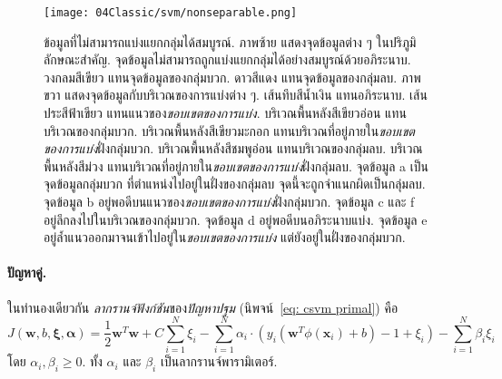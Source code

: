 \begin{figure}
	\begin{center}
	\texttt{[image: 04Classic/svm/nonseparable.png]}
	\end{center}
	\caption[ข้อมูลที่ไม่สามารถแบ่งแยกกลุ่มได้สมบูรณ์]{ข้อมูลที่ไม่สามารถแบ่งแยกกลุ่มได้สมบูรณ์.
	ภาพซ้าย แสดงจุดข้อมูลต่าง ๆ ในปริภูมิลักษณะสำคัญ.
	จุดข้อมูลไม่สามารถถูกแบ่งแยกกลุ่มได้อย่างสมบูรณ์ด้วยอภิระนาบ.
	วงกลมสีเขียว แทนจุดข้อมูลของกลุ่มบวก.
	ดาวสีแดง แทนจุดข้อมูลของกลุ่มลบ.
	ภาพขวา แสดงจุดข้อมูลกับบริเวณของการแบ่งต่าง ๆ.
	เส้นทึบสีน้ำเงิน แทนอภิระนาบ.
	เส้นประสีฟ้าเขียว แทนแนวของ\textit{ขอบเขตของการแบ่ง}.
	บริเวณพื้นหลังสีเขียวอ่อน แทนบริเวณของกลุ่มบวก.
	บริเวณพื้นหลังสีเขียวมะกอก แทนบริเวณที่อยู่ภายใน\textit{ขอบเขตของการแบ่ง}ฝั่งกลุ่มบวก.
	บริเวณพื้นหลังสีชมพูอ่อน แทนบริเวณของกลุ่มลบ.
	บริเวณพื้นหลังสีม่วง แทนบริเวณที่อยู่ภายใน\textit{ขอบเขตของการแบ่ง}ฝั่งกลุ่มลบ.
	จุดข้อมูล a เป็นจุดข้อมูลกลุ่มบวก ที่ตำแหน่งไปอยู่ในฝั่งของกลุ่มลบ จุดนี้จะถูกจำแนกผิดเป็นกลุ่มลบ.
	จุดข้อมูล b อยู่พอดีบนแนวของ\textit{ขอบเขตของการแบ่ง}ฝั่งกลุ่มบวก.
	จุดข้อมูล c และ f อยู่ลึกลงไปในบริเวณของกลุ่มบวก.
	จุดข้อมูล d อยู่พอดีบนอภิระนาบแบ่ง.
	จุดข้อมูล e อยู่ล้ำแนวออกมาจนเข้าไปอยู่ใน\textit{ขอบเขตของการแบ่ง} แต่ยังอยู่ในฝั่งของกลุ่มบวก.
	}
	\label{fig: non-linearly-separable data}
\end{figure}

\paragraph{ปัญหาคู่.}
ในทำนองเดียวกัน
\textit{ลากรานจ์ฟังก์ชัน}ของ\textit{ปัญหาปฐม} (นิพจน์~\ref{eq: csvm primal})
คือ
\[
J(\bm{w}, b, \bm{\xi}, \bm{\alpha})
= \frac{1}{2} \bm{w}^T \bm{w} + C \sum_{i=1}^N \xi_i
- \sum_{i=1}^N \alpha_i \cdot \left(y_i \left( \bm{w}^T \phi(\bm{x}_i) + b \right) - 1 + \xi_i\right)
- \sum_{i=1}^N \beta_i \xi_i
\]
โดย $\alpha_i, \beta_i \geq 0$.
ทั้ง $\alpha_i$ และ $\beta_i$ เป็นลากรานจ์พารามิเตอร์.

